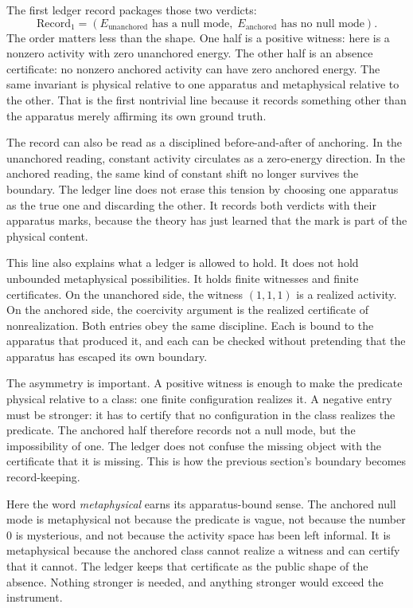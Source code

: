 The first ledger record packages those two verdicts:
\[
  \mathrm{Record}_1
  =
  \left(
    E_{\mathrm{unanchored}} \text{ has a null mode},\;
    E_{\mathrm{anchored}} \text{ has no null mode}
  \right).
\]
The order matters less than the shape. One half is a positive witness: here is a
nonzero activity with zero unanchored energy. The other half is an absence
certificate: no nonzero anchored activity can have zero anchored energy. The
same invariant is physical relative to one apparatus and metaphysical relative
to the other. That is the first nontrivial line because it records something
other than the apparatus merely affirming its own ground truth.

The record can also be read as a disciplined before-and-after of anchoring. In
the unanchored reading, constant activity circulates as a zero-energy direction.
In the anchored reading, the same kind of constant shift no longer survives the
boundary. The ledger line does not erase this tension by choosing one apparatus
as the true one and discarding the other. It records both verdicts with their
apparatus marks, because the theory has just learned that the mark is part of the
physical content.

This line also explains what a ledger is allowed to hold. It does not hold
unbounded metaphysical possibilities. It holds finite witnesses and finite
certificates. On the unanchored side, the witness \((1,1,1)\) is a realized
activity. On the anchored side, the coercivity argument is the realized
certificate of nonrealization. Both entries obey the same discipline. Each is
bound to the apparatus that produced it, and each can be checked without
pretending that the apparatus has escaped its own boundary.

The asymmetry is important. A positive witness is enough to make the predicate
physical relative to a class: one finite configuration realizes it. A negative
entry must be stronger: it has to certify that no configuration in the class
realizes the predicate. The anchored half therefore records not a null mode, but
the impossibility of one. The ledger does not confuse the missing object with
the certificate that it is missing. This is how the previous section's boundary
becomes record-keeping.

Here the word \emph{metaphysical} earns its apparatus-bound sense. The anchored
null mode is metaphysical not because the predicate is vague, not because the
number \(0\) is mysterious, and not because the activity space has been left
informal. It is metaphysical because the anchored class cannot realize a witness
and can certify that it cannot. The ledger keeps that certificate as the public shape of
the absence. Nothing stronger is needed, and anything stronger would exceed the
instrument.

